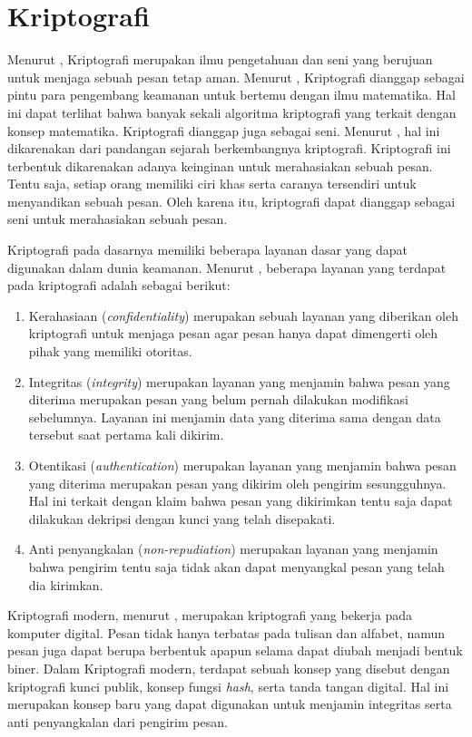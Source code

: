 \section{Kriptografi}
Menurut \textcite{schneier1996}, Kriptografi merupakan ilmu pengetahuan dan seni yang berujuan untuk menjaga sebuah pesan tetap aman. Menurut \textcite{anderson2008}, Kriptografi dianggap sebagai pintu para pengembang keamanan untuk bertemu dengan ilmu matematika. Hal ini dapat terlihat bahwa banyak sekali algoritma kriptografi yang terkait dengan konsep matematika. Kriptografi dianggap juga sebagai seni. Menurut \textcite{munir2019}, hal ini dikarenakan dari pandangan sejarah berkembangnya kriptografi. Kriptografi ini terbentuk dikarenakan adanya keinginan untuk merahasiakan sebuah pesan. Tentu saja, setiap orang memiliki ciri khas serta caranya tersendiri untuk menyandikan sebuah pesan. Oleh karena itu, kriptografi dapat dianggap sebagai seni untuk merahasiakan sebuah pesan. 

Kriptografi pada dasarnya memiliki beberapa layanan dasar yang dapat digunakan dalam dunia keamanan. Menurut \textcite{schneier1996}, beberapa layanan yang terdapat pada kriptografi adalah sebagai berikut:
\begin{enumerate}
  \item Kerahasiaan (\emph{confidentiality}) merupakan sebuah layanan yang diberikan oleh kriptografi untuk menjaga pesan agar pesan hanya dapat dimengerti oleh pihak yang memiliki otoritas. 
  \item Integritas (\emph{integrity}) merupakan layanan yang menjamin bahwa pesan yang diterima merupakan pesan yang belum pernah dilakukan modifikasi sebelumnya. Layanan ini menjamin data yang diterima sama dengan data tersebut saat pertama kali dikirim.
  \item Otentikasi (\emph{authentication}) merupakan layanan yang menjamin bahwa pesan yang diterima merupakan pesan yang dikirim oleh pengirim sesungguhnya. Hal ini terkait dengan klaim bahwa pesan yang dikirimkan tentu saja dapat dilakukan dekripsi dengan kunci yang telah disepakati.
  \item Anti penyangkalan (\emph{non-repudiation}) merupakan layanan yang menjamin bahwa pengirim tentu saja tidak akan dapat menyangkal pesan yang telah dia kirimkan.
\end{enumerate} 

Kriptografi modern, menurut \textcite{munir2019}, merupakan kriptografi yang bekerja pada komputer digital. Pesan tidak hanya terbatas pada tulisan dan alfabet, namun pesan juga dapat berupa berbentuk apapun selama dapat diubah menjadi bentuk biner. Dalam Kriptografi modern, terdapat sebuah konsep yang disebut dengan kriptografi kunci publik, konsep fungsi \emph{hash}, serta tanda tangan digital. Hal ini merupakan konsep baru yang dapat digunakan untuk menjamin integritas serta anti penyangkalan dari pengirim pesan.

